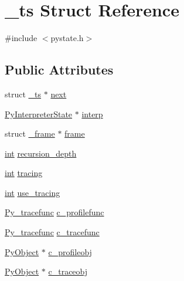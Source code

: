\hypertarget{struct__ts}{}\section{\+\_\+ts Struct Reference}
\label{struct__ts}


{\ttfamily \#include $<$pystate.\+h$>$}

\subsection*{Public Attributes}
\begin{DoxyCompactItemize}
\item 
struct \mbox{\hyperlink{struct__ts}{\+\_\+ts}} $\ast$ \mbox{\hyperlink{struct__ts_a07c61e6e5019334491b799a4a35a364c}{next}}
\item 
\mbox{\hyperlink{pystate_8h_a7c19e387e7a6c47f2d1d639a0f741d4f}{Py\+Interpreter\+State}} $\ast$ \mbox{\hyperlink{struct__ts_a218498c5d2725df0a11a604c873c7af2}{interp}}
\item 
struct \mbox{\hyperlink{struct__frame}{\+\_\+frame}} $\ast$ \mbox{\hyperlink{struct__ts_a06cc5290746f822f1ef96a87983d0388}{frame}}
\item 
\mbox{\hyperlink{warnings_8h_a74f207b5aa4ba51c3a2ad59b219a423b}{int}} \mbox{\hyperlink{struct__ts_a6b8d0637b018eecff79f70a6e23292ac}{recursion\+\_\+depth}}
\item 
\mbox{\hyperlink{warnings_8h_a74f207b5aa4ba51c3a2ad59b219a423b}{int}} \mbox{\hyperlink{struct__ts_a471e83bc7094f90ee8ec4834eb240ad5}{tracing}}
\item 
\mbox{\hyperlink{warnings_8h_a74f207b5aa4ba51c3a2ad59b219a423b}{int}} \mbox{\hyperlink{struct__ts_acfef5d2d1002bcf0b14e4535e8a9827b}{use\+\_\+tracing}}
\item 
\mbox{\hyperlink{pystate_8h_ab5c10be1fd41472f8b22569c5f15f8e6}{Py\+\_\+tracefunc}} \mbox{\hyperlink{struct__ts_a354e6c632d0c7d71b95edfa41a304e94}{c\+\_\+profilefunc}}
\item 
\mbox{\hyperlink{pystate_8h_ab5c10be1fd41472f8b22569c5f15f8e6}{Py\+\_\+tracefunc}} \mbox{\hyperlink{struct__ts_a62ef329915123042c2cb1a943e986e18}{c\+\_\+tracefunc}}
\item 
\mbox{\hyperlink{_python27_2object_8h_aadc84ac7aed2cfa6f20c25f62bf3dac7}{Py\+Object}} $\ast$ \mbox{\hyperlink{struct__ts_a69de89b983a3a9a5f81bbf59eb27023d}{c\+\_\+profileobj}}
\item 
\mbox{\hyperlink{_python27_2object_8h_aadc84ac7aed2cfa6f20c25f62bf3dac7}{Py\+Object}} $\ast$ \mbox{\hyperlink{struct__ts_ad1d1bf64520bc604c7177fd4ca6fbff0}{c\+\_\+traceobj}}

\end{DoxyCompactItemize}
